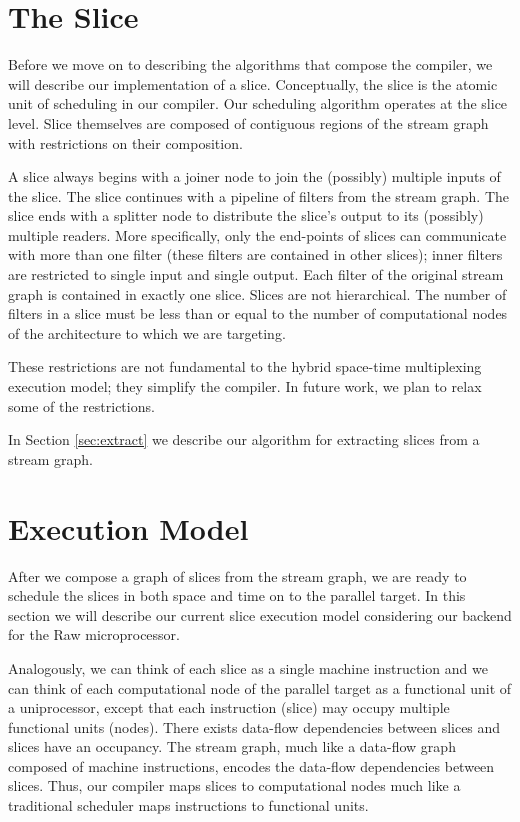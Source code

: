\section{The Slice}
Before we move on to describing the algorithms that compose the
compiler, we will describe our implementation of a
slice. Conceptually, the slice is the atomic unit of scheduling in our
compiler.  Our scheduling algorithm operates at the slice level.
Slice themselves are composed of contiguous regions of the stream
graph with restrictions on their composition. 

A slice always begins with a joiner node to join the (possibly)
multiple inputs of the slice.  The slice continues with a pipeline of
filters from the stream graph.  The slice ends with a splitter node to
distribute the slice's output to its (possibly) multiple readers.
More specifically, only the end-points of slices can communicate with
more than one filter (these filters are contained in other slices);
inner filters are restricted to single input and single output.  Each
filter of the original stream graph is contained in exactly one slice.
Slices are not hierarchical.  The number of filters in a slice must be
less than or equal to the number of computational nodes of the
architecture to which we are targeting.

These restrictions are not fundamental to the hybrid space-time
multiplexing execution model; they simplify the compiler.  In future
work, we plan to relax some of the restrictions.

In Section \ref{sec:extract} we describe our algorithm for extracting
slices from a stream graph.

\section{Execution Model}
After we compose a graph of slices from the stream graph, we are ready
to schedule the slices in both space and time on to the parallel
target.  In this section we will describe our current slice execution
model considering our backend for the Raw microprocessor.

Analogously, we can think of each slice as a single machine
instruction and we can think of each computational node of the
parallel target as a functional unit of a uniprocessor, except that
each instruction (slice) may occupy multiple functional units
(nodes). There exists data-flow dependencies between slices and slices
have an occupancy.  The stream graph, much like a data-flow graph
composed of machine instructions, encodes the data-flow dependencies
between slices. Thus, our compiler maps slices to computational nodes
much like a traditional scheduler maps instructions to functional
units.

